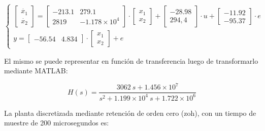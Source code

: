 \vspace{-0.5cm}
\begin{equation}
    \begin{cases}
        \begin{bmatrix}
            \dot{x_1}\\
            \dot{x_2}
        \end{bmatrix}
        =
        \begin{bmatrix}
            -213.1  &   279.1\\
            2819    &   -1.178\times 10^4
        \end{bmatrix}
        \cdot
        \begin{bmatrix}
            x_1 \\
            x_2
        \end{bmatrix}
        +
        \begin{bmatrix}
            -28.98 \\
            294,4
        \end{bmatrix}
        \cdot
        u 
        +
        \begin{bmatrix}
            -11.92 \\
            -95.37
        \end{bmatrix}
        \cdot
        e
        \\
        y =
        \begin{bmatrix}
            -56.54 & 4.834
        \end{bmatrix}
        \cdot
        \begin{bmatrix}
            x_1 \\
            x_2
        \end{bmatrix}
        +
        e

    \end{cases}
\end{equation}

El mismo se puede representar en función de transferencia luego de transformarlo mediante MATLAB:

\vspace{-0.5cm}
\begin{equation}
    H(s) = \dfrac{3062\ s + 1.456 \times 10^7}{s^2 + 1.199 \times 10^4\ s + 1.722 \times 10^6}
\end{equation}
\vspace{-0.5cm}

La planta discretizada mediante retención de orden cero (zoh), con un tiempo de muestre de 200
microsegundos es:

